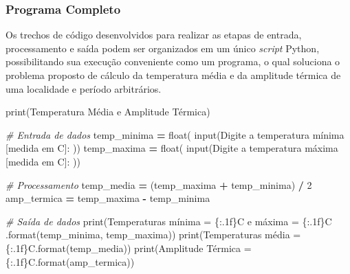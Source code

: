 \documentclass[
]{book}
\newenvironment{Shaded}{\begin{snugshade}}{\end{snugshade}}
\newcommand{\BuiltInTok}[1]{#1}
\newcommand{\CommentTok}[1]{\textcolor[rgb]{0.56,0.35,0.01}{\textit{#1}}}
\newcommand{\DecValTok}[1]{\textcolor[rgb]{0.00,0.00,0.81}{#1}}
\newcommand{\NormalTok}[1]{#1}
\newcommand{\OperatorTok}[1]{\textcolor[rgb]{0.81,0.36,0.00}{\textbf{#1}}}
\newcommand{\SpecialCharTok}[1]{\textcolor[rgb]{0.00,0.00,0.00}{#1}}
\newcommand{\StringTok}[1]{\textcolor[rgb]{0.31,0.60,0.02}{#1}}
\begin{document}
\hypertarget{programa-completo}{%
\subsubsection{Programa Completo}\label{programa-completo}}

Os trechos de código desenvolvidos para realizar as etapas de entrada, processamento e saída podem ser organizados em um único \emph{script} Python, possibilitando sua execução conveniente como um programa, o qual soluciona o problema proposto de cálculo da temperatura média e da amplitude térmica de uma localidade e período arbitrários.

\begin{Shaded}
\begin{Highlighting}[]
\BuiltInTok{print}\NormalTok{(}\StringTok{\textquotesingle{}Temperatura Média e Amplitude Térmica\textquotesingle{}}\NormalTok{)}

\CommentTok{\# Entrada de dados}
\NormalTok{temp\_minima }\OperatorTok{=} \BuiltInTok{float}\NormalTok{(}
    \BuiltInTok{input}\NormalTok{(}\StringTok{\textquotesingle{}Digite a temperatura mínima [medida em C]: \textquotesingle{}}\NormalTok{))}
\NormalTok{temp\_maxima }\OperatorTok{=} \BuiltInTok{float}\NormalTok{(}
    \BuiltInTok{input}\NormalTok{(}\StringTok{\textquotesingle{}Digite a temperatura máxima [medida em C]: \textquotesingle{}}\NormalTok{))}

\CommentTok{\# Processamento}
\NormalTok{temp\_media }\OperatorTok{=}\NormalTok{ (temp\_maxima }\OperatorTok{+}\NormalTok{ temp\_minima) }\OperatorTok{/} \DecValTok{2}
\NormalTok{amp\_termica }\OperatorTok{=}\NormalTok{ temp\_maxima }\OperatorTok{{-}}\NormalTok{ temp\_minima}

\CommentTok{\# Saída de dados}
\BuiltInTok{print}\NormalTok{(}\StringTok{\textquotesingle{}Temperaturas mínima = }\SpecialCharTok{\{:.1f\}}\StringTok{C e máxima = }\SpecialCharTok{\{:.1f\}}\StringTok{C\textquotesingle{}}
\NormalTok{    .}\BuiltInTok{format}\NormalTok{(temp\_minima, temp\_maxima))}
\BuiltInTok{print}\NormalTok{(}\StringTok{\textquotesingle{}Temperaturas média = }\SpecialCharTok{\{:.1f\}}\StringTok{C\textquotesingle{}}\NormalTok{.}\BuiltInTok{format}\NormalTok{(temp\_media))}
\BuiltInTok{print}\NormalTok{(}\StringTok{\textquotesingle{}Amplitude Térmica = }\SpecialCharTok{\{:.1f\}}\StringTok{C\textquotesingle{}}\NormalTok{.}\BuiltInTok{format}\NormalTok{(amp\_termica))}
\end{Highlighting}
\end{Shaded}
\end{document}
